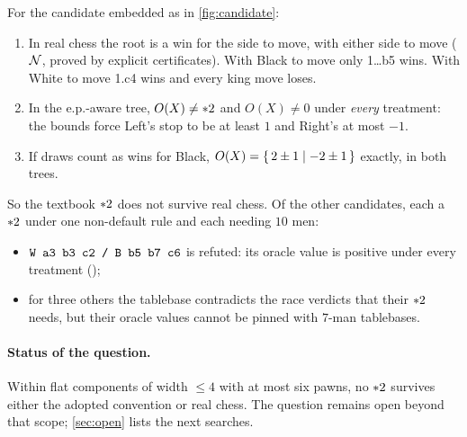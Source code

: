 \begin{theorem}\label{thm:oracle-cand}
For the candidate embedded as in \cref{fig:candidate}:
\begin{enumerate}[label=(\alph*)]
\item In real chess the root is a win for the side to move, with either side to move ($\mathcal{N}$, proved by
  explicit certificates). With Black to move only 1\dots b5 wins. With White to move 1.c4 wins and every king
  move loses.
\item In the e.p.-aware tree, $O(X)\ne\mathord{\ast 2}$ and $O(X)\ne0$ under \emph{every} treatment: the bounds force
  Left's stop to be at least $1$ and Right's at most $-1$.
\item If draws count as wins for Black, $O(X)=\{\,2\pm1 \mid -2\pm1\,\}$ exactly, in both trees.
\end{enumerate}
\end{theorem}
\noindent So the textbook $\mathord{\ast 2}$ does not survive real chess. Of the other candidates, each a $\mathord{\ast 2}$ under
one non-default rule and each needing $10$ men:
\begin{itemize}
\item $\texttt{W a3 b3 c2 / B b5 b7 c6}$ is refuted: its oracle value is positive under every treatment
  ();
\item for three others the tablebase contradicts the race verdicts that their $\mathord{\ast 2}$ needs, but their
  oracle values cannot be pinned with $7$-man tablebases.
\end{itemize}

\paragraph{Status of the question.} Within flat components of width $\le4$ with at most six pawns, no
$\mathord{\ast 2}$ survives either the adopted convention or real chess. The question remains open beyond that
scope; \cref{sec:open} lists the next searches.

